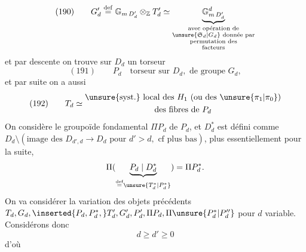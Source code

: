 \[
(190)\qquad G'_d\overset{\mathrm{def}}{=}\mathbb G_{m\,D'_d}\otimes_{\mathbb Z}T'_d\simeq\underbrace{\mathbb G^{d}_{m\,D'_d}}_{\substack{\text{avec opération de}\\\unsure{\mathfrak S_d|G_d}\text{ donnée par}\\\text{permutation des}\\\text{facteurs}}}
\]
et par descente on trouve sur $D_d$ un torseur
\[
(191)\qquad P_d\quad\text{torseur sur }D_d,\text{ de groupe }G_d,
\]
et par suite on a aussi
\[
(192)\qquad T_d\simeq\begin{gathered}\text{\unsure{syst.} local des }H_1\text{ (ou des }\unsure{\pi_1|\pi_0}\text{)}\\\text{des fibres de }P_d
\end{gathered}
\]
On considère le groupoïde fondamental $\Pi P_d$ de $P_d$, et   $D_d^*$ est défini comme $D_d\setminus(\text{image des }D_{d',d}\longrightarrow D_d\text{ pour }d'>d,\text{ cf plus bas})$, plus essentiellement pour la suite,
\[
\Pi(\underbrace{P_d\mid D_d^*}_{\overset{\mathrm{def}}{=}\unsure{T_d^*|P_d^*}})=\Pi P_d^*.
\]
On va considérer la variation des objets précédents $T_d,G_d,\inserted{P_d,P_d^*,}T'_d,G'_d,P'_d,\Pi P_d,\Pi\unsure{P_d^*|P''_d}$  pour $d$ variable. Considérons donc
\[
d\geq d'\geq0
\]
d'où 

